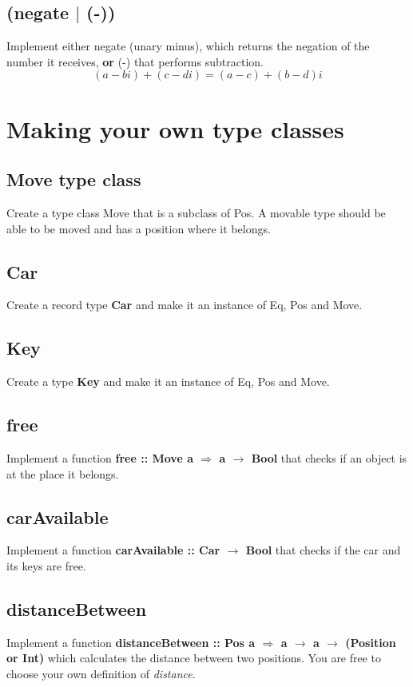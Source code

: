 \documentclass{article}
\begin{document}
\subsection{(negate $|$ (-))}
Implement either negate (unary minus), which returns the negation of the number it receives, \textbf{or} (-) that performs subtraction.
\[(a-bi)+(c-di)=(a-c)+(b-d)i\]

\section{Making your own type classes}

\subsection{Move type class}
Create a type class Move that is a subclass of Pos. A movable type should be able to be moved and has a position where it belongs.

\subsection{Car}
Create a record type \textbf{Car} and make it an instance of Eq, Pos and Move.

\subsection{Key}
Create a type \textbf{Key} and make it an instance of Eq, Pos and Move.

\subsection{free}
Implement a function \textbf{free :: Move a $\Rightarrow$ a $\rightarrow$ Bool} that checks if an object is at the place it belongs.

\subsection{carAvailable}
Implement a function \textbf{carAvailable :: Car $\rightarrow$ Bool} that checks if the car and its keys are free.

\subsection{distanceBetween}
Implement a function \textbf{distanceBetween :: Pos a $\Rightarrow$ a $\rightarrow$ a $\rightarrow$ (Position or Int)} which calculates the distance between two positions. You are free to choose your own definition of \textit{distance}.
\end{document}
